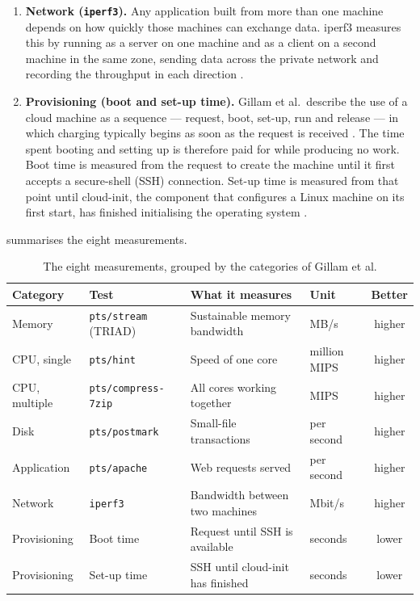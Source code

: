 \begin{enumerate}
  \item \textbf{Network (\texttt{iperf3}).} Any application built from more than one machine depends on
  how quickly those machines can exchange data. iperf3 measures this by running as
  a server on one machine and as a client on a second machine in the same zone,
  sending data across the private network and recording the throughput in each
  direction \cite{iperf3_ESnet,Gillam_FairBenchmarking_2013}.

  \item \textbf{Provisioning (boot and set-up time).} Gillam et al.\ describe the use of a cloud machine as a
  sequence --- request, boot, set-up, run and release --- in which charging
  typically begins as soon as the request is received
  \cite{Gillam_FairBenchmarking_2013}. The time spent booting and setting up is
  therefore paid for while producing no work. Boot time is measured from the
  request to create the machine until it first accepts a secure-shell (SSH)
  connection. Set-up time is measured from that point until cloud-init, the
  component that configures a Linux machine on its first start, has finished
  initialising the operating system \cite{CloudInit}.
\end{enumerate}

 summarises the eight measurements.

\begin{table}[htbp]
  \centering
  \caption{The eight measurements, grouped by the categories of Gillam et al.}
  \label{tab:bench-profiles}
  \footnotesize
  \setlength{\tabcolsep}{4pt}
  \begin{tabularx}{\textwidth}{@{}l l X l c@{}}
    \toprule
    Category & Test & What it measures & Unit & Better \\
    \midrule
    Memory         & \texttt{pts/stream} (TRIAD) & Sustainable memory bandwidth         & MB/s          & higher \\
    CPU, single    & \texttt{pts/hint}           & Speed of one core                    & million MIPS  & higher \\
    CPU, multiple  & \texttt{pts/compress-7zip}  & All cores working together           & MIPS          & higher \\
    Disk           & \texttt{pts/postmark}       & Small-file transactions              & per second    & higher \\
    Application    & \texttt{pts/apache}         & Web requests served                  & per second    & higher \\
    Network        & \texttt{iperf3}             & Bandwidth between two machines       & Mbit/s        & higher \\
    Provisioning   & Boot time                   & Request until SSH is available        & seconds       & lower  \\
    Provisioning   & Set-up time                 & SSH until cloud-init has finished    & seconds       & lower  \\
    \bottomrule
  \end{tabularx}
\end{table}


